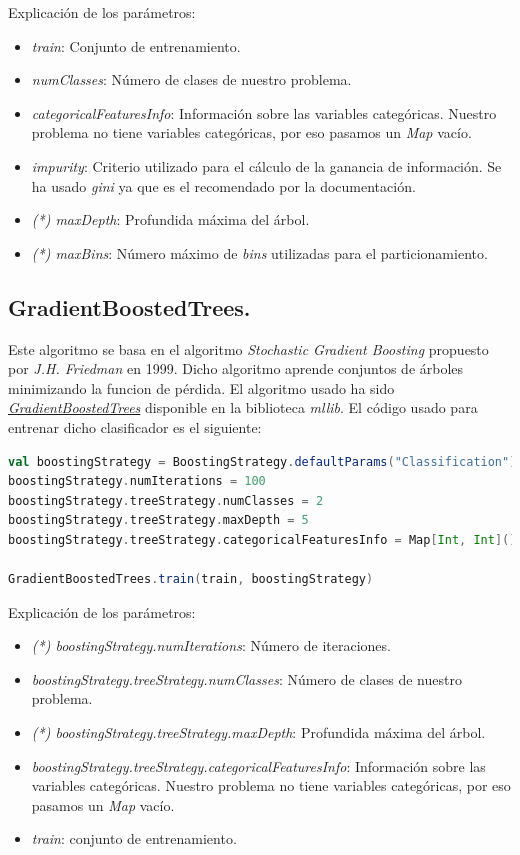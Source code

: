 \documentclass[11pt]{article}
\begin{document}
Explicación de los parámetros:

\begin{itemize}
	\item \textit{train}: Conjunto de entrenamiento.
	\item \textit{numClasses}: Número de clases de nuestro problema.
	\item \textit{categoricalFeaturesInfo}: Información sobre las variables categóricas. Nuestro problema no tiene variables categóricas, por eso pasamos un \textit{Map} vacío.
	\item \textit{impurity}: Criterio utilizado para el cálculo de la ganancia de información. Se ha usado \textit{gini} ya que es el recomendado por la documentación.
	\item \textit{(*) maxDepth}: Profundida máxima del árbol.
	\item \textit{(*) maxBins}: Número máximo de \textit{bins} utilizadas para el particionamiento.
\end{itemize}

\subsection{GradientBoostedTrees.}

Este algoritmo se basa en el algoritmo \textit{Stochastic Gradient Boosting} propuesto por \textit{J.H. Friedman} en 1999. Dicho algoritmo aprende conjuntos de árboles minimizando la funcion de pérdida. El algoritmo usado ha sido \href{https://spark.apache.org/docs/2.2.0/api/scala/index.html#org.apache.spark.mllib.tree.GradientBoostedTrees}{\textit{GradientBoostedTrees}} disponible en la biblioteca \textit{mllib}. El código usado para entrenar dicho clasificador es el siguiente:

\begin{lstlisting}[frame=single, language=scala, xleftmargin=.25in, basicstyle=\small, upquote=true, breaklines = true]
val boostingStrategy = BoostingStrategy.defaultParams("Classification")
boostingStrategy.numIterations = 100
boostingStrategy.treeStrategy.numClasses = 2
boostingStrategy.treeStrategy.maxDepth = 5
boostingStrategy.treeStrategy.categoricalFeaturesInfo = Map[Int, Int]()

GradientBoostedTrees.train(train, boostingStrategy)
\end{lstlisting}

Explicación de los parámetros:

\begin{itemize}
	\item \textit{(*) boostingStrategy.numIterations}: Número de iteraciones.
	\item \textit{boostingStrategy.treeStrategy.numClasses}: Número de clases de nuestro problema.
	\item \textit{(*) boostingStrategy.treeStrategy.maxDepth}: Profundida máxima del árbol.
	\item \textit{boostingStrategy.treeStrategy.categoricalFeaturesInfo}: Información sobre las variables categóricas. Nuestro problema no tiene variables categóricas, por eso pasamos un \textit{Map} vacío.
	\item \textit{train}: conjunto de entrenamiento.
\end{itemize}
\end{document}
